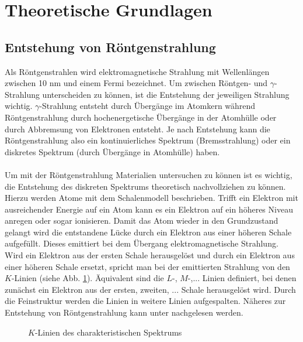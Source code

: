 \section{Theoretische Grundlagen}
\subsection{Entstehung von Röntgenstrahlung}
Als Röntgenstrahlen wird elektromagnetische Strahlung mit Wellenlängen zwischen 10 nm und einem Fermi bezeichnet. Um zwischen Röntgen- und $\gamma$-Strahlung unterscheiden zu können, ist die Entstehung der jeweiligen Strahlung wichtig. $\gamma$-Strahlung entsteht durch Übergänge im Atomkern während Röntgenstrahlung durch hochenergetische Übergänge in der Atomhülle oder durch Abbremsung von Elektronen entsteht. Je nach Entstehung kann die Röntgenstrahlung also ein kontinuierliches Spektrum (Bremsstrahlung) oder ein diskretes Spektrum (durch Übergänge in Atomhülle) haben.\\ \\
Um mit der Röntgenstrahlung Materialien untersuchen zu können ist es wichtig, die Entstehung des diskreten Spektrums theoretisch nachvollziehen zu können. Hierzu werden Atome mit dem Schalenmodell beschrieben. Trifft ein Elektron mit ausreichender Energie auf ein Atom kann es ein Elektron auf ein höheres Niveau anregen oder sogar ionisieren. Damit das Atom wieder in den Grundzustand gelangt wird die entstandene Lücke durch ein Elektron aus einer höheren Schale aufgefüllt. Dieses emittiert bei dem Übergang elektromagnetische Strahlung. Wird ein Elektron aus der ersten Schale herausgelöst und durch ein Elektron aus einer höheren Schale ersetzt, spricht man bei der emittierten Strahlung von den $K$-Linien (siehe Abb. \ref{fig:k_linien}). Äquivalent sind die $L$-, $M$-,... Linien definiert, bei denen zunächst ein Elektron aus der ersten, zweiten, ... Schale herausgelöst wird. Durch die Feinstruktur werden die Linien in weitere Linien aufgespalten. Näheres zur Entstehung von Röntgenstrahlung kann unter \cite{grundlagen} nachgelesen werden.
\begin{figure}[h]
  \centering
  \caption{$K$-Linien des charakteristischen Spektrums}
  \label{fig:k_linien}
\end{figure}

